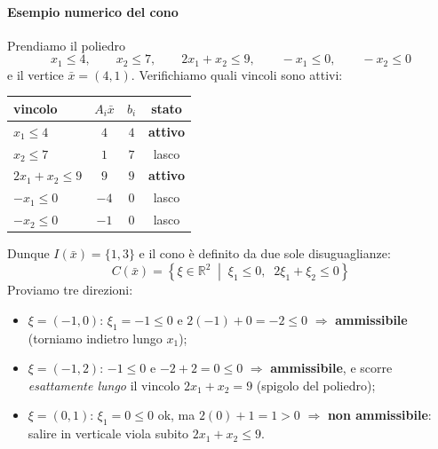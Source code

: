\documentclass[12pt]{extarticle} %
\begin{document}
\paragraph{Esempio numerico del cono}
Prendiamo il poliedro
\[
x_1 \le 4, \qquad x_2 \le 7, \qquad 2x_1 + x_2 \le 9, \qquad -x_1 \le 0, \qquad -x_2 \le 0
\]
e il vertice $\bar{x} = (4,1)$. Verifichiamo quali vincoli sono attivi:
\begin{center}
\begin{tabular}{lccc}
\hline
vincolo & $A_i\bar{x}$ & $b_i$ & stato \\
\hline
$x_1 \le 4$ & $4$ & $4$ & \textbf{attivo} \\
$x_2 \le 7$ & $1$ & $7$ & lasco \\
$2x_1+x_2 \le 9$ & $9$ & $9$ & \textbf{attivo} \\
$-x_1 \le 0$ & $-4$ & $0$ & lasco \\
$-x_2 \le 0$ & $-1$ & $0$ & lasco \\
\hline
\end{tabular}
\end{center}
Dunque $I(\bar{x}) = \{1,3\}$ e il cono è definito da due sole disuguaglianze:
\[
C(\bar{x}) = \left\{ \xi \in \mathbb{R}^2 \;\middle|\; \xi_1 \le 0, \;\; 2\xi_1 + \xi_2 \le 0 \right\}
\]
Proviamo tre direzioni:
\begin{itemize}
    \item $\xi = (-1,0)$: $\xi_1 = -1 \le 0$ e $2(-1)+0 = -2 \le 0$ $\Rightarrow$ \textbf{ammissibile} (torniamo indietro lungo $x_1$);
    \item $\xi = (-1,2)$: $-1 \le 0$ e $-2+2 = 0 \le 0$ $\Rightarrow$ \textbf{ammissibile}, e scorre \emph{esattamente lungo} il vincolo $2x_1+x_2 = 9$ (spigolo del poliedro);
    \item $\xi = (0,1)$: $\xi_1 = 0 \le 0$ ok, ma $2(0)+1 = 1 > 0$ $\Rightarrow$ \textbf{non ammissibile}: salire in verticale viola subito $2x_1+x_2\le 9$.
\end{itemize}
\end{document}

